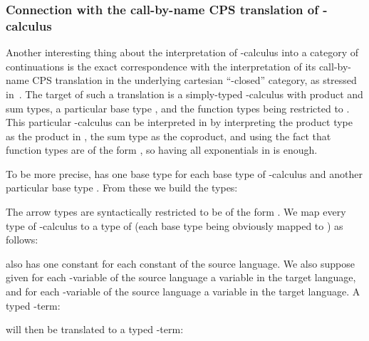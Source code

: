 \documentclass{CSML}
\begin{document}
\subsubsection{Connection with the call-by-name CPS translation of \texorpdfstring{}{lambda-mu}-calculus}
\label{cps}
Another interesting thing about the interpretation of -calculus into a category of continuations is the exact correspondence with the interpretation of its call-by-name CPS translation in the underlying cartesian ``-closed'' category, as stressed in~\cite{StreicherContinuation}. The target of such a translation is a simply-typed -calculus  with product and sum types, a particular base type , and the function types being restricted to . This particular -calculus can be interpreted in  by interpreting the product type as the product in , the sum type as the coproduct, and using the fact that function types are of the form , so having all exponentials  in  is enough.\par
To be more precise,  has one base type  for each base type  of -calculus and another particular base type . From these we build the types:

The arrow types are syntactically restricted to be of the form . We map every type  of -calculus to a type  of  (each base type  being obviously mapped to ) as follows:

 also has one constant  for each constant  of the source language. We also suppose given for each -variable  of the source language a variable  in the target language, and for each -variable  of the source language a variable  in the target language. A typed -term:

will then be translated to a typed -term:
\end{document}
